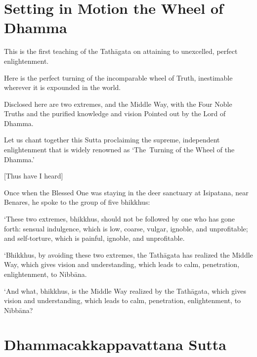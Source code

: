 
\chapterTocDelegatePageNumber
\chapter{Setting in Motion the Wheel of Dhamma}%

\setTocDelegatedPageNumber
\englishText
\renewcommand{\englishTitle}{Setting in Motion the Wheel of Dhamma}

\begin{leader}

This is the first teaching of the Tathāgata on attaining to unexcelled,
perfect enlightenment.

Here is the perfect turning of the incomparable wheel of Truth,
inestimable wherever it is expounded in the world.

Disclosed here are two extremes, and the Middle Way, with the Four Noble
Truths and the purified knowledge and vision Pointed out by the Lord of
Dhamma.

Let us chant together this Sutta proclaiming the supreme, independent
enlightenment that is widely renowned as ‘The~Turning of the Wheel of
the Dhamma.’

\end{leader}

[Thus have I heard]

Once when the Blessed One was staying in the deer sanctuary at
Isipatana, near Benares, he spoke to the group of five bhikkhus:

‘These two extremes, bhikkhus, should not be followed by one who has
gone forth: sensual indulgence, which is low, coarse, vulgar, ignoble,
and unprofitable; and self-torture, which is painful, ignoble, and
unprofitable.

‘Bhikkhus, by avoiding these two extremes, the Tathāgata has realized
the Middle Way, which gives vision and understanding, which leads to
calm, penetration, enlightenment, to Nibbāna.

‘And what, bhikkhus, is the Middle Way realized by the Tathāgata, which
gives vision and understanding, which leads to calm, penetration,
enlightenment, to Nibbāna?

\chapterTocSubIndentTrue
\chapter{Dhammacakkappavattana Sutta}%

